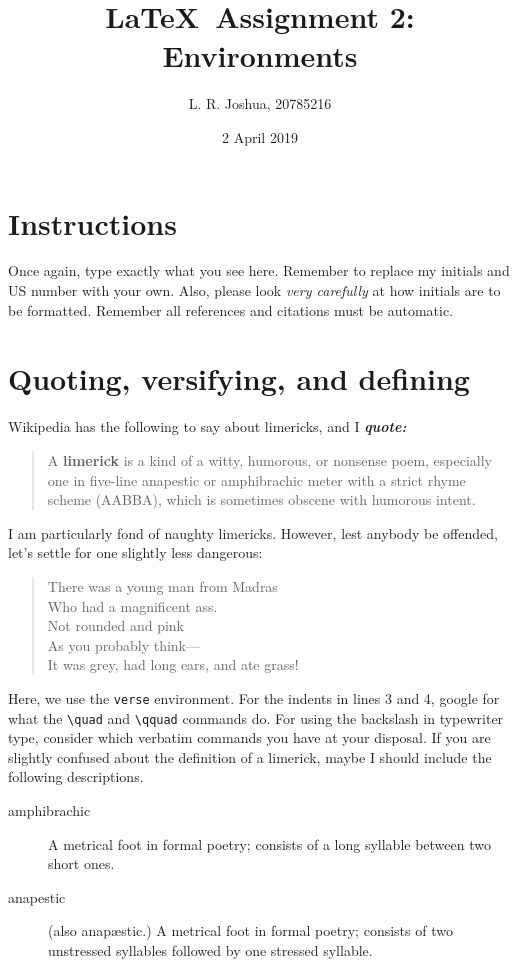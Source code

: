 \documentclass[10pt,a4paper]{article}
\title{\LaTeX\ Assignment 2: Environments}
\author{L. R. Joshua, 20785216}
\date{2 April 2019}
\theoremstyle{definition}
\begin{document}
    \maketitle
    
    \section{Instructions}
    Once again, type exactly what you see here. Remember to replace my initials
    and US number with your own. Also, please look \emph{very carefully} at how initials
    are to be formatted. Remember all references and citations must be automatic.
    
    \section{Quoting, versifying, and defining}
    Wikipedia has the following to say about limericks, and I \textbf{\emph{quote:}}
    \begin{quote}
        A \textbf{limerick} is a kind of a witty, humorous, or nonsense poem, especially
        one in five-line anapestic or amphibrachic meter with a strict
        rhyme scheme (AABBA), which is sometimes obscene with humorous
        intent.
    \end{quote}
    
    I am particularly fond of naughty limericks. However, lest anybody be offended,
    let's settle for one slightly less dangerous:
    \begin{verse}
        There was a young man from Madras\\
        Who had a magnificent ass.\\
        \quad Not rounded and pink\\
        \quad As you probably think---\\
        It was grey, had long ears, and ate grass!
    \end{verse}
    Here, we use the \texttt{verse} environment. For the indents in lines 3 and 4, google for
    what the \verb$\quad$ and \verb$\qquad$ commands do.
    For using the backslash in typewriter type, consider which verbatim commands you have at your disposal.
    If you are slightly confused about the definition of a limerick, maybe I should
    include the following descriptions.
    \begin{description}
    \item[amphibrachic]{A metrical foot in formal poetry; consists of a long syllable
    between two short ones.}
    \item[anapestic]{(also anap\ae{}stic.)  A metrical foot in formal poetry; consists of two
    unstressed syllables followed by one stressed syllable.}
    \end{description}
    
\end{document}
